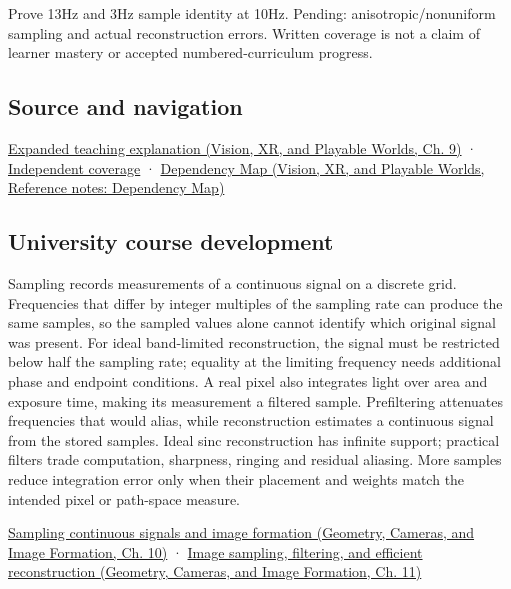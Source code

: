 Prove 13Hz and 3Hz sample identity at 10Hz. Pending: anisotropic/nonuniform sampling and actual reconstruction errors. Written coverage is not a claim of learner mastery or accepted numbered-curriculum progress.

\subsection{Source and navigation}\label{appendix-6a7869dd79a6-source-and-navigation}

\href{../07-Vision-XR-and-Playable-Worlds/main.pdf\#nameddest=04-visual-computing-ii-ch042-sampling-is-a-question-of-what-remains-distinguishable}{Expanded teaching explanation (Vision, XR, and Playable Worlds, Ch. 9)} · \hyperref[appendix-fd090d982a15-xr01---independent-seeing-and-representation-source]{Independent coverage} · \href{../07-Vision-XR-and-Playable-Worlds/main.pdf\#nameddest=appendix-4ad47bdd269a}{Dependency Map (Vision, XR, and Playable Worlds, Reference notes: Dependency Map)}

\subsection{University course development}\label{appendix-6a7869dd79a6-university-course-development}

Sampling records measurements of a continuous signal on a discrete grid. Frequencies that differ by integer multiples of the sampling rate can produce the same samples, so the sampled values alone cannot identify which original signal was present. For ideal band-limited reconstruction, the signal must be restricted below half the sampling rate; equality at the limiting frequency needs additional phase and endpoint conditions. A real pixel also integrates light over area and exposure time, making its measurement a filtered sample. Prefiltering attenuates frequencies that would alias, while reconstruction estimates a continuous signal from the stored samples. Ideal sinc reconstruction has infinite support; practical filters trade computation, sharpness, ringing and residual aliasing. More samples reduce integration error only when their placement and weights match the intended pixel or path-space measure.

\href{../03-Geometry-Cameras-and-Image-Formation/main.pdf\#nameddest=03-visual-computing-i-ch003-sampling-continuous-signals-and-image-formation}{Sampling continuous signals and image formation (Geometry, Cameras, and Image Formation, Ch. 10)} · \href{../03-Geometry-Cameras-and-Image-Formation/main.pdf\#nameddest=03-visual-computing-i-ch004-image-sampling-filtering-and-efficient-reconstruction}{Image sampling, filtering, and efficient reconstruction (Geometry, Cameras, and Image Formation, Ch. 11)}

